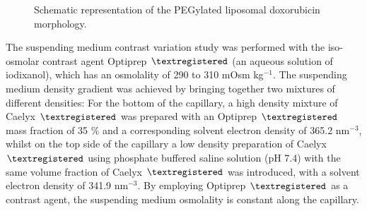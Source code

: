 \begin{figure}
	\centering
		\caption{Schematic representation of the PEGylated liposomal doxorubicin morphology.}
\end{figure}

The suspending medium contrast variation study was performed with the iso-osmolar contrast agent Optiprep $\textregistered$ (an aqueous solution of iodixanol), which has an osmolality of 290 to 310 mOsm kg$^{-1}$. The suspending medium density gradient was achieved by bringing together two mixtures of different densities: For the bottom of the capillary, a high density mixture of Caelyx $\textregistered$ was prepared with an Optiprep $\textregistered$ mass fraction of 35 $\%$ and a corresponding solvent electron density of 365.2 nm$^{-3}$, whilst on the top side of the capillary a low density preparation of Caelyx $\textregistered$  using phosphate buffered saline solution (pH 7.4) with the same volume fraction of Caelyx $\textregistered$ was introduced, with a solvent electron density of 341.9 nm$^{-3}$. By employing Optiprep $\textregistered$ as a contrast agent, the suspending medium osmolality is constant along the capillary. 

